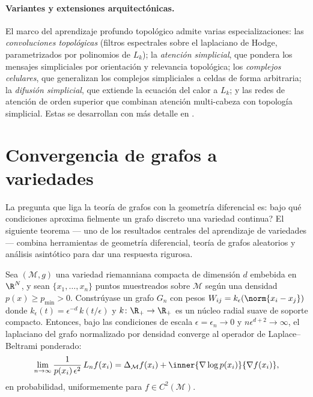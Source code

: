 \paragraph{Variantes y extensiones arquitect\'onicas.}
El marco del aprendizaje profundo topol\'ogico admite varias especializaciones:
las \emph{convoluciones topol\'ogicas} (filtros espectrales sobre el laplaciano
de Hodge, parametrizados por polinomios de $L_k$); la \emph{atenci\'on
simplicial}, que pondera los mensajes simpliciales por orientaci\'on y relevancia
topol\'ogica; los \emph{complejos celulares}, que generalizan los complejos
simpliciales a celdas de forma arbitraria; la \emph{difusi\'on simplicial}, que
extiende la ecuaci\'on del calor a $L_k$; y las redes de atenci\'on de orden
superior que combinan atenci\'on multi-cabeza con topolog\'ia simplicial. Estas se
desarrollan con m\'as detalle en .

\section{Convergencia de grafos a variedades}
\label{sec:graphs:convergence}

La pregunta que liga la teor\'ia de grafos con la geometr\'ia diferencial es:
\textquestiondown bajo qu\'e condiciones aproxima fielmente un grafo discreto una
variedad continua? El siguiente teorema --- uno de los resultados centrales del
aprendizaje de variedades --- combina herramientas de geometr\'ia diferencial,
teor\'ia de grafos aleatorios y an\'alisis asint\'otico para dar una respuesta
rigurosa.

\begin{theorem}
\label{thm:graphs:convergence}
Sea $(\mathcal{M}, g)$ una variedad riemanniana compacta de dimensi\'on $d$
embebida en $\R^N$, y sean $\{x_1, \dots, x_n\}$ puntos muestreados sobre
$\mathcal{M}$ seg\'un una densidad $p(x) \ge p_{\min} > 0$. Constr\'uyase un grafo
$G_n$ con pesos $W_{ij} = k_\epsilon(\norm{x_i - x_j})$ donde
$k_\epsilon(t) = \epsilon^{-d}\, k(t/\epsilon)$ y $k \colon \R_+ \to \R_+$ es un
n\'ucleo radial suave de soporte compacto. Entonces, bajo las condiciones de
escala $\epsilon = \epsilon_n \to 0$ y $n\epsilon^{d+2} \to \infty$, el laplaciano
del grafo normalizado por densidad converge al operador de Laplace--Beltrami
ponderado:
\[
  \lim_{n \to \infty} \frac{1}{p(x_i)\, \epsilon^2}\, L_n f(x_i)
    = \Delta_{\mathcal{M}} f(x_i)
      + \inner{\nabla \log p(x_i)}{\nabla f(x_i)},
\]
en probabilidad, uniformemente para $f \in C^2(\mathcal{M})$.
\end{theorem}

